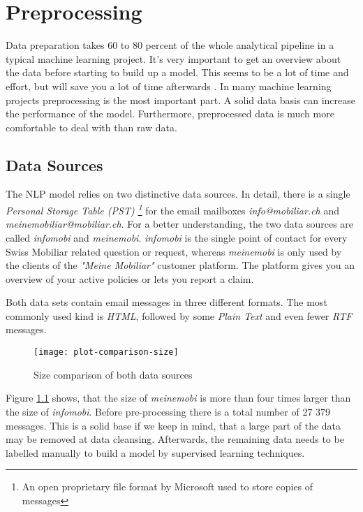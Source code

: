\chapter{Preprocessing}

Data preparation takes 60 to 80 percent of the whole analytical pipeline in a typical machine learning project. It's very important to get an overview about the data before starting to build up a model. This seems to be a lot of time and effort, but will save you a lot of time afterwards \cite{naman18}. In many machine learning projects preprocessing is the most important part. A solid data basis can increase the performance of the model. Furthermore, preprocessed data is much more comfortable to deal with than raw data.

\section{Data Sources}
\label{chap:data-source}

The NLP model relies on two distinctive data sources. In detail, there is a single \emph{Personal Storage Table (PST) \footnote{An open proprietary file format by Microsoft used to store copies of messages}} for the email mailboxes \emph{info@mobiliar.ch} and \emph{meinemobiliar@mobiliar.ch}. For a better understanding, the two data sources are called \emph{infomobi} and \emph{meinemobi}. \emph{infomobi} is the single point of contact for every Swiss Mobiliar related question or request, whereas \emph{meinemobi} is only used by the clients of the \emph{"Meine Mobiliar"} customer platform. The platform gives you an overview of your active policies or lets you report a claim.

Both data sets contain email messages in three different formats. The most commonly used kind is \emph{HTML}, followed by some \emph{Plain Text} and even fewer \emph{RTF} messages.

\begin{figure}[!ht]
    \centering
    \texttt{[image: plot-comparison-size]}
    \caption{Size comparison of both data sources}
    \label{fig:plot-comparison-size}
\end{figure}

Figure \ref{fig:plot-comparison-size} shows, that the size of \emph{meinemobi} is more than four times larger than the size of \emph{infomobi}. Before pre-processing there is a total number of 27 379 messages. This is a solid base if we keep in mind, that a large part of the data may be removed at data cleansing. Afterwards, the remaining data needs to be labelled manually to build a model by supervised learning techniques.

